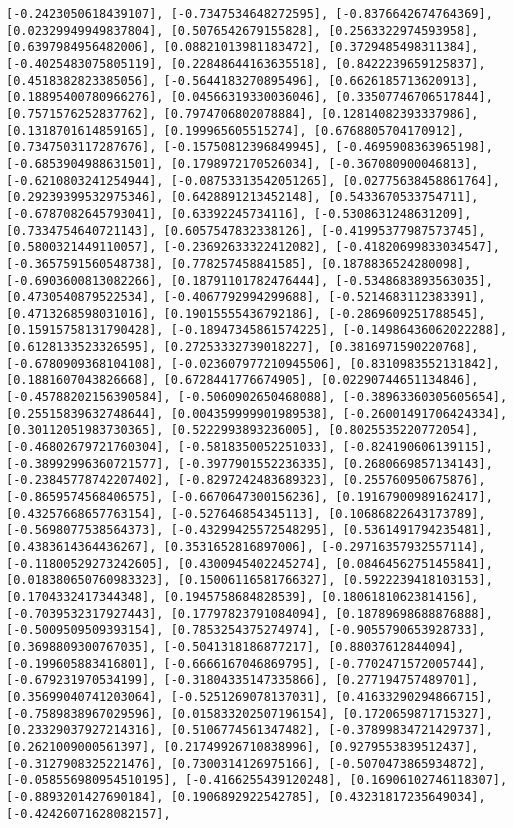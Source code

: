 \documentclass[11pt]{article}
\begin{document}
\begin{Verbatim}[commandchars=\\\{\}]
[-0.2423050618439107], [-0.7347534648272595], [-0.8376642674764369], [0.02329949949837804], [0.5076542679155828], [0.2563322974593958], [0.6397984956482006], [0.08821013981183472], [0.3729485498311384], [-0.4025483075805119], [0.22848644163635518], [0.8422239659125837], [0.4518382823385056], [-0.5644183270895496], [0.6626185713620913], [0.18895400780966276], [0.04566319330036046], [0.33507746706517844], [0.7571576252837762], [0.7974706802078884], [0.12814082393337986], [0.1318701614859165], [0.199965605515274], [0.6768805704170912], [0.7347503117287676], [-0.15750812396849945], [-0.4695908363965198], [-0.6853904988631501], [0.1798972170526034], [-0.367080900046813], [-0.6210803241254944], [-0.08753313542051265], [0.02775638458861764], [0.29239399532975346], [0.6428891213452148], [0.5433670533754711], [-0.6787082645793041], [0.63392245734116], [-0.5308631248631209], [0.7334754640721143], [0.6057547832338126], [-0.41995377987573745], [0.5800321449110057], [-0.23692633322412082], [-0.41820699833034547], [-0.3657591560548738], [0.778257458841585], [0.1878836524280098], [-0.6903600813082266], [0.18791101782476444], [-0.5348683893563035], [0.4730540879522534], [-0.4067792994299688], [-0.5214683112383391], [0.4713268598031016], [0.19015555436792186], [-0.2869609251788545], [0.15915758131790428], [-0.18947345861574225], [-0.14986436062022288], [0.6128133523326595], [0.27253332739018227], [0.3816971590220768], [-0.6780909368104108], [-0.023607977210945506], [0.8310983552131842], [0.1881607043826668], [0.6728441776674905], [0.02290744651134846], [-0.45788202156390584], [-0.5060902650468088], [-0.38963360305605654], [0.25515839632748644], [0.004359999901989538], [-0.26001491706424334], [0.30112051983730365], [0.5222993893236005], [0.8025535220772054], [-0.46802679721760304], [-0.5818350052251033], [-0.824190606139115], [-0.38992996360721577], [-0.3977901552236335], [0.2680669857134143], [-0.23845778742207402], [-0.8297242483689323], [0.255760950675876], [-0.8659574568406575], [-0.6670647300156236], [0.19167900989162417], [0.43257668657763154], [-0.527646854345113], [0.10686822643173789], [-0.5698077538564373], [-0.43299425572548295], [0.5361491794235481], [0.4383614364436267], [0.3531652816897006], [-0.29716357932557114], [-0.11800529273242605], [0.4300945402245274], [0.08464562751455841], [0.018380650760983323], [0.15006116581766327], [0.5922239418103153], [0.1704332417344348], [0.1945758684828539], [0.18061810623814156], [-0.7039532317927443], [0.17797823791084094], [0.18789698688876888], [-0.5009509509393154], [0.7853254375274974], [-0.9055790653928733], [0.3698809300767035], [-0.5041318186877217], [0.88037612844094], [-0.199605883416801], [-0.6666167046869795], [-0.7702471572005744], [-0.679231970534199], [-0.31804335147335866], [0.277194757489701], [0.35699040741203064], [-0.5251269078137031], [0.41633290294866715], [-0.7589838967029596], [0.015833202507196154], [0.1720659871715327], [0.23329037927214316], [0.5106774561347482], [-0.37899834721429737], [0.2621009000561397], [0.21749926710838996], [0.9279553839512437], [-0.3127908325221476], [0.7300314126975166], [-0.5070473865934872], [-0.058556980954510195], [-0.4166255439120248], [0.16906102746118307], [-0.8893201427690184], [0.1906892922542785], [0.43231817235649034], [-0.42426071628082157], 
\end{Verbatim}
\end{document}
